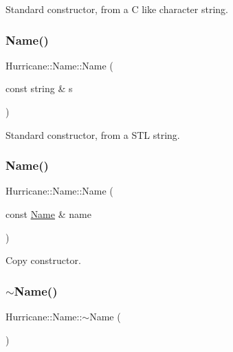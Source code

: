 Standard constructor, from a C like character string. \mbox{\label{classHurricane_1_1Name_a446df795ebe2e641710696bf775eb491}} 
\subsubsection{\texorpdfstring{Name()}{Name()}\hspace{0.1cm}{\footnotesize\ttfamily [3/4]}}
{\footnotesize\ttfamily Hurricane\+::\+Name\+::\+Name (\begin{DoxyParamCaption}\item[{const string \&}]{s }\end{DoxyParamCaption})}

Standard constructor, from a S\+TL string. \mbox{\label{classHurricane_1_1Name_a56ffee3e75dc343c7ec8b61102c1d3a2}} 
\subsubsection{\texorpdfstring{Name()}{Name()}\hspace{0.1cm}{\footnotesize\ttfamily [4/4]}}
{\footnotesize\ttfamily Hurricane\+::\+Name\+::\+Name (\begin{DoxyParamCaption}\item[{const \hyperlink{classHurricane_1_1Name}{Name} \&}]{name }\end{DoxyParamCaption})}

Copy constructor. \mbox{\label{classHurricane_1_1Name_a1ce605ce16980334f93d7cc278984842}} 
\subsubsection{\texorpdfstring{$\sim$\+Name()}{~Name()}}
{\footnotesize\ttfamily Hurricane\+::\+Name\+::$\sim$\+Name (\begin{DoxyParamCaption}{ }\end{DoxyParamCaption})}

